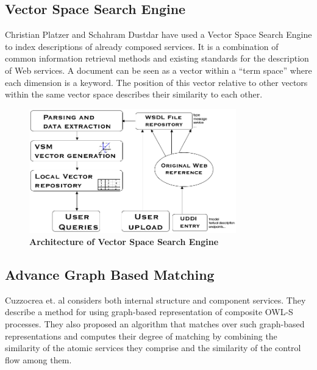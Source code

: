 \documentclass[12pt, oneside]{book}
\begin{document}
\subsection{Vector Space Search Engine}
Christian Platzer and Schahram Dustdar \cite{vector} have used a Vector Space Search Engine to index descriptions of already composed services. It is a combination of common information retrieval methods and existing standards for the description of Web services. A document can be seen as a vector within a “term space” where each dimension is a keyword. The position of this vector relative to other vectors within the same vector space describes their similarity to each other.
\begin{figure}[h]
\centering
\includegraphics[width=0.8\textwidth]{pics/vector.png}
\caption{\textbf{Architecture of Vector Space Search Engine}}
\label{img: match}
\end{figure}

\subsection{Advance Graph Based Matching}
Cuzzocrea et. al \cite{advance_graph} considers both internal structure and component services. They describe a method for using graph-based representation of composite OWL-S processes. They also proposed an algorithm that matches over such graph-based representations and computes their degree of matching by combining the similarity of the atomic services they comprise and the similarity of the control flow among them.
\end{document}
